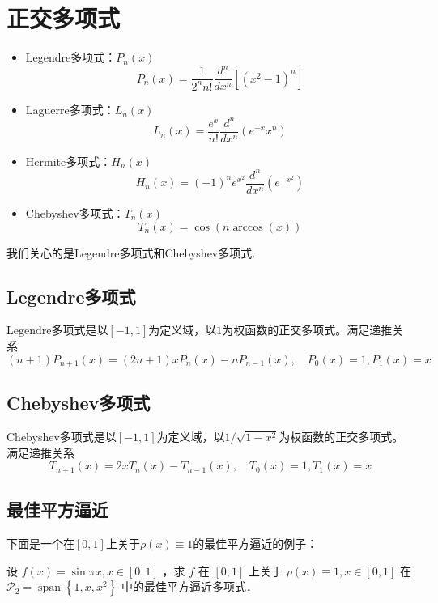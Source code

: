 \section{正交多项式}

\begin{itemize}
    \item Legendre多项式：$P_n(x)$
          \[
              P_n(x) = \frac{1}{2^n n!} \frac{d^n}{dx^n} \left[(x^2 - 1)^n\right]
          \]
    \item Laguerre多项式：$L_n(x)$
          \[
              L_n(x) = \frac{e^x}{n!} \frac{d^n}{dx^n} \left(e^{-x} x^n\right)
          \]
    \item Hermite多项式：$H_n(x)$
          \[
              H_n(x) = (-1)^n e^{x^2} \frac{d^n}{dx^n} \left(e^{-x^2}\right)
          \]
    \item Chebyshev多项式：$T_n(x)$
          \[
              T_n(x) = \cos(n \arccos(x))
          \]
\end{itemize}
我们关心的是Legendre多项式和Chebyshev多项式.
\subsection{Legendre多项式}
Legendre多项式是以$[-1,1]$为定义域，以$1$为权函数的正交多项式。满足递推关系
\[
    (n+1)P_{n+1}(x)=(2n+1)xP_n(x)-nP_{n-1}(x),\quad P_0(x)=1,P_1(x)=x
\]
\subsection{Chebyshev多项式}
Chebyshev多项式是以$[-1,1]$为定义域，以$1/\sqrt{1-x^2}$为权函数的正交多项式。满足递推关系
\[
    T_{n+1}(x)=2xT_n(x)-T_{n-1}(x),\quad T_0(x)=1,T_1(x)=x
\]
\subsection{最佳平方逼近}
下面是一个在$[0,1]$上关于$\rho(x) \equiv 1$的最佳平方逼近的例子：
\begin{example}
    设 $f(x)=\sin \pi x, x \in[0,1]$ ，求 $f$ 在 $[0,1]$ 上关于 $\rho(x) \equiv 1, x \in[0,1]$ 在 $\mathscr{P}_2=\operatorname{span}\left\{1, x, x^2\right\}$ 中的最佳平方逼近多项式．
\end{example}

